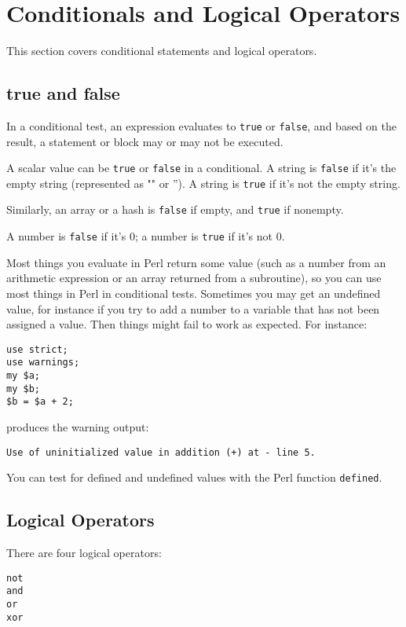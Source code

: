 \section{Conditionals and Logical Operators}
This section covers conditional statements and logical operators.

\subsection{true and false}
In a conditional test, an expression evaluates to \verb|true| or \verb|false|, and based on the result, a statement or block may or may not be executed.

A scalar value can be \verb|true| or \verb|false| in a conditional. A string is \verb|false| if it's the empty string (represented as "" or ''). A string is \verb|true| if it's not the empty string.

Similarly, an array or a hash is \verb|false| if empty, and \verb|true| if nonempty.

A number is \verb|false| if it's 0; a number is \verb|true| if it's not 0.

Most things you evaluate in Perl return some value (such as a number from an arithmetic expression or an array returned from a subroutine), so you can use most things in Perl in conditional tests. Sometimes you may get an undefined value, for instance if you try to add a number to a variable that has not been assigned a value. Then things might fail to work as expected. For instance:

\begin{lstlisting}
use strict;
use warnings;
my $a;
my $b;
$b = $a + 2;
\end{lstlisting}

produces the warning output:

\begin{lstlisting}
Use of uninitialized value in addition (+) at - line 5.
\end{lstlisting}

You can test for defined and undefined values with the Perl function \verb|defined|.

\subsection{Logical Operators}
There are four logical operators:

\begin{lstlisting}
not
and
or
xor
\end{lstlisting}

